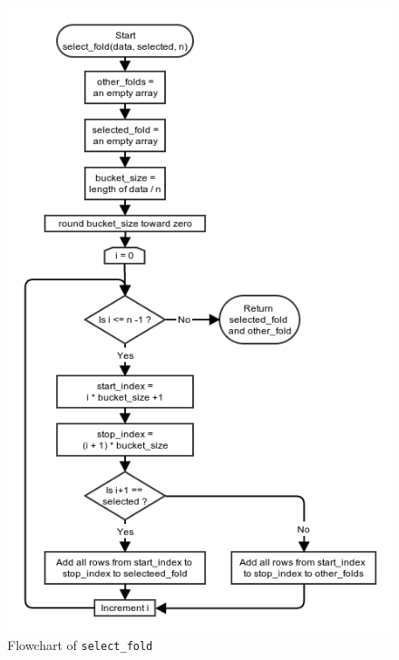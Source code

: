 \documentclass[10pt,a4paper]{article}
\begin{document}
\begin{figure}[!ht]
	\centering
	\includegraphics[scale=0.8]{images/flow_chart/select_fold.png}
	\caption{Flowchart of \tt{select\_fold}}
	\label{fig:select_fold}
\end{figure}
\end{document}
